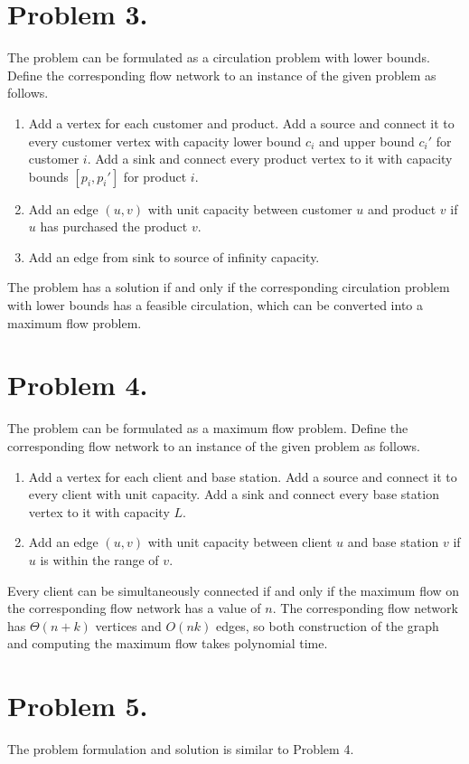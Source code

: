 \documentclass{article}
\begin{document}
\section*{Problem 3.}

The problem can be formulated as a circulation problem with lower bounds. Define the corresponding flow network to an instance of the given problem as follows.
\begin{enumerate}
    \item Add a vertex for each customer and product. Add a source and connect it to every customer vertex with capacity lower bound $c_i$ and upper bound $c_i'$ for customer $i$. Add a sink and connect every product vertex to it with capacity bounds $[p_i, p_i']$ for product $i$.
    \item Add an edge $(u, v)$ with unit capacity between customer $u$ and product $v$ if $u$ has purchased the product $v$.
    \item Add an edge from sink to source of infinity capacity.
\end{enumerate}

The problem has a solution if and only if the corresponding circulation problem with lower bounds has a feasible circulation, which can be converted into a maximum flow problem.

\section*{Problem 4.}

The problem can be formulated as a maximum flow problem. Define the corresponding flow network to an instance of the given problem as follows.
\begin{enumerate}
    \item Add a vertex for each client and base station. Add a source and connect it to every client with unit capacity. Add a sink and connect every base station vertex to it with capacity $L$.
    \item Add an edge $(u, v)$ with unit capacity between client $u$ and base station $v$ if $u$ is within the range of $v$.
\end{enumerate}

Every client can be simultaneously connected if and only if the maximum flow on the corresponding flow network has a value of $n$. The corresponding flow network has $\Theta(n + k)$ vertices and $O(nk)$ edges, so both construction of the graph and computing the maximum flow takes polynomial time.

\section*{Problem 5.}

The problem formulation and solution is similar to Problem 4.
\end{document}
